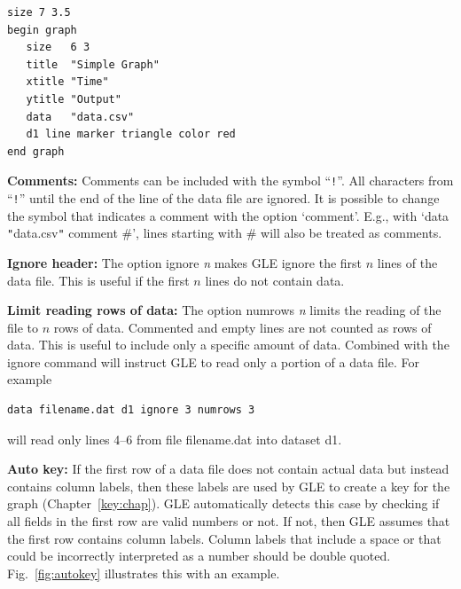 \begin{commanddescription}
\begin{minipage}[c]{8cm}
\begin{Verbatim}
size 7 3.5
begin graph
   size   6 3
   title  "Simple Graph"
   xtitle "Time"
   ytitle "Output"
   data   "data.csv"
   d1 line marker triangle color red
end graph
\end{Verbatim}
\end{minipage}
\hfill
\begin{minipage}[c]{7cm}
\mbox{}
\end{minipage}

{\bf Comments:} Comments can be included with the symbol ``\verb+!+''. All characters from ``\verb+!+'' until the end of the line of the data file are ignored. It is possible to change the symbol that indicates a comment with the option `comment'. E.g., with `{\sf data \verb+"+data.csv\verb+"+ comment \#}', lines starting with \# will also be treated as comments.

{\bf Ignore header:}\label{opt:ignore} The option {\sf ignore {\it n}} makes GLE ignore the first $n$ lines of the data file. This is useful if the first $n$ lines do not contain data.

{\bf Limit reading rows of data:}\label{opt:numrows} The option {\sf numrows {\it n}} limits the reading of the file to $n$ rows of data.  Commented and empty lines are not counted as rows of data. This is useful to include only a specific amount of data.  Combined with the {\sf ignore} command will instruct GLE to read only a portion of a data file.  For example
\begin{Verbatim}
data filename.dat d1 ignore 3 numrows 3
\end{Verbatim}
will read only lines 4–6 from file filename.dat into dataset d1.

{\bf Auto key:} If the first row of a data file does not contain actual data but instead contains column labels, then these labels are used by GLE to create a key for the graph (Chapter~\ref{key:chap}). GLE automatically detects this case by checking if all fields in the first row are valid numbers or not. If not, then GLE assumes that the first row contains column labels. Column labels that include a space or that could be incorrectly interpreted as a number should be double quoted. Fig.~\ref{fig:autokey} illustrates this with an example.


\end{commanddescription}
